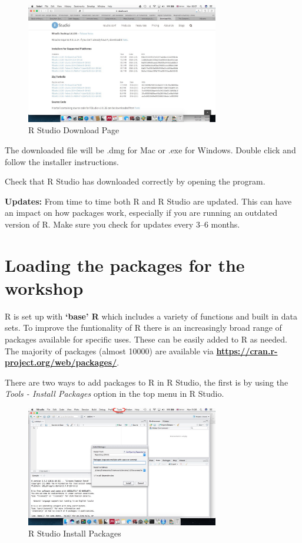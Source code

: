 \documentclass[12pt]{article}
\begin{document}
\begin{figure}[h]
	\centering
	\includegraphics[width=0.75\textwidth]{rstudio.jpg}
	\caption{R Studio Download Page}
\end{figure}

The downloaded file will be .dmg for Mac or .exe for Windows. Double click and follow the installer instructions.

Check that R Studio has downloaded correctly by opening the program.

\textbf{Updates:} From time to time both R and R Studio are updated. This can have an impact on how packages work, especially if you are running an outdated version of R. Make sure you check for updates every 3--6 months.

\section{Loading the packages for the workshop}
R is set up with \textbf{`base' R} which includes a variety of functions and built in data sets. To improve the funtionality of R there is an increasingly broad range of packages available for specific uses. These can be easily added to R as needed. The majority of packages (almost 10000) are available via \textbf{\url{https://cran.r-project.org/web/packages/}}.

There are two ways to add packages to R in R Studio, the first is by using the \textit{Tools - Install Packages} option in the top menu in R Studio.

\begin{figure}[H]
	\centering
	\includegraphics[width=0.75\textwidth]{installPkg.jpg}
	\caption{R Studio Install Packages}
\end{figure}
\end{document}
